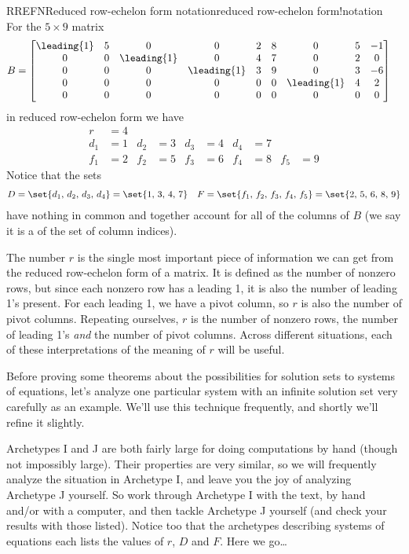 \begin{example}{RREFN}{Reduced row-echelon form notation}{reduced row-echelon form!notation}
For the $5\times 9$ matrix
\begin{align*}
B&=
\begin{bmatrix}
\leading{1}&5&0&0&2&8&0&5&-1\\
0&0&\leading{1}&0&4&7&0&2&0\\
0&0&0&\leading{1}&3&9&0&3&-6\\
0&0&0&0&0&0&\leading{1}&4&2\\
0&0&0&0&0&0&0&0&0
\end{bmatrix}
\end{align*}
in reduced row-echelon form we have
\begin{align*}
r&=4\\
d_1&=1
&
d_2&=3
&
d_3&=4
&
d_4&=7\\
f_1&=2
&
f_2&=5
&
f_3&=6
&
f_4&=8
&
f_5&=9
\end{align*}
Notice that the sets
%
\begin{align*}
D&=\set{d_1,\,d_2,\,d_3,\,d_4}=\set{1,\,3,\,4,\,7}
&
F=\set{f_1,\,f_2,\,f_3,\,f_4,\,f_5}=\set{2,\,5,\,6,\,8,\,9}
\end{align*}
%
have nothing in common and together account for all of the columns of $B$ (we say it is a  of the set of column indices).
\end{example}
%
The number $r$ is the single most important piece of information we can get from the reduced row-echelon form of a matrix.  It is defined as the number of nonzero rows, but since each nonzero row has a leading 1, it is also the number of leading 1's present.   For each leading 1, we have a pivot column, so $r$ is also the number of pivot columns.  Repeating ourselves, $r$ is the number of nonzero rows, the number of leading 1's {\em and} the number of pivot columns.  Across different situations, each of these interpretations of the meaning of $r$ will be useful.\par
%
Before proving some theorems about the possibilities for solution sets to systems of equations, let's analyze one particular system with an infinite solution set very carefully as an example.  We'll use this technique frequently, and shortly we'll refine it slightly.\par
%
Archetypes I and J are both fairly large for doing computations by hand (though not impossibly large).  Their properties are very similar, so we will frequently analyze the situation in Archetype I, and leave you the joy of analyzing Archetype J yourself.  So work through Archetype I with the text,  by hand and/or with a computer, and then tackle Archetype J yourself (and check your results with those listed).  Notice too that the archetypes describing systems of equations each lists the values of $r$, $D$ and $F$.  Here we go\dots
